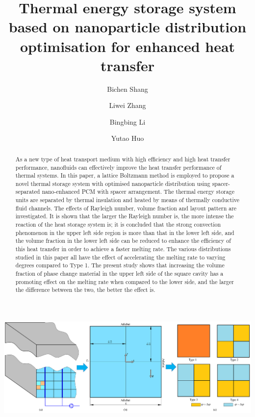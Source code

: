 \documentclass[preprint,12pt]{elsarticle}
\begin{document}
\begin{frontmatter}
	
	\title{Thermal energy storage system based on nanoparticle distribution optimisation for enhanced heat transfer}
		\author[a]{Bichen Shang} 
			\author[a]{Liwei Zhang} 	
	\author[a]{Bingbing Li} 
	\author[a]{Yutao Huo}
	
\begin{abstract}
	
As a new type of heat transport medium with high efficiency and high heat transfer performance, nanofluids can effectively improve the heat transfer performance of thermal systems. In this paper, a lattice Boltzmann method is employed to propose a novel thermal storage system with optimised nanoparticle distribution using spacer-separated nano-enhanced PCM with spacer arrangement. The thermal energy storage units are separated by thermal insulation and heated by means of thermally conductive fluid channels. The effects of Rayleigh number, volume fraction and layout pattern are investigated. It is shown that the larger the Rayleigh number is, the more intense the reaction of the heat storage system is; it is concluded that the strong convection phenomenon in the upper left side region is more than that in the lower left side, and the volume fraction in the lower left side can be reduced to enhance the efficiency of this heat transfer in order to achieve a faster melting rate. The various distributions studied in this paper all have the effect of accelerating the melting rate to varying degrees compared to Type 1. The present study shows that increasing the volume fraction of phase change material in the upper left side of the square cavity has a promoting effect on the melting rate when compared to the lower side, and the larger the difference between the two, the better the effect is.

	\end{abstract}
	
	\begin{graphicalabstract}
		\includegraphics[scale=0.5]{Fig/Numerical_Model.png}
	\end{graphicalabstract}
	

\end{frontmatter}
\end{document}
